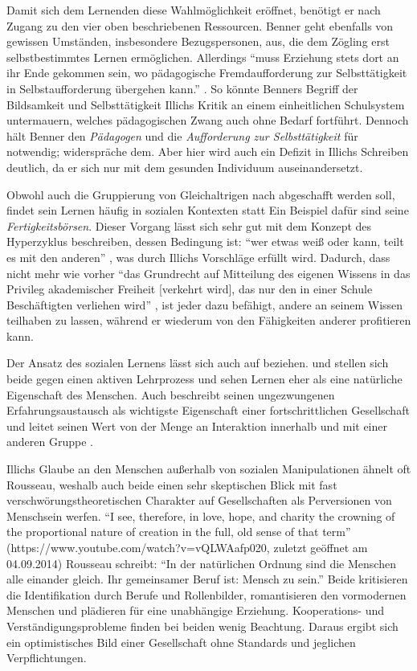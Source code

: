 Damit sich dem Lernenden diese Wahlmöglichkeit eröffnet, benötigt er nach \citeauthor{Illich-1971} Zugang zu den vier oben beschriebenen Ressourcen.
Benner geht ebenfalls von gewissen Umständen, insbesondere Bezugspersonen, aus, die dem Zögling erst selbstbestimmtes Lernen ermöglichen.
Allerdings ``muss Erziehung stets dort an ihr Ende gekommen sein, wo pädagogische Fremdaufforderung zur Selbsttätigkeit in Selbstaufforderung übergehen kann.'' \parencite[91]{benner-2012}.
So könnte Benners Begriff der Bildsamkeit und Selbsttätigkeit Illichs Kritik an einem einheitlichen Schulsystem untermauern, welches pädagogischen Zwang auch ohne Bedarf fortführt.
Dennoch hält Benner den \emph{Pädagogen} und die \emph{Aufforderung zur Selbsttätigkeit} für notwendig; \citeauthor{Illich-1971} widerspräche dem.
Aber hier wird auch ein Defizit in Illichs Schreiben deutlich, da er sich nur mit dem gesunden Individuum auseinandersetzt.

Obwohl auch die Gruppierung von Gleichaltrigen nach \citeauthor{Illich-1971} abgeschafft werden soll, findet sein Lernen häufig in sozialen Kontexten statt
Ein Beispiel dafür sind seine \emph{Fertigkeitsbörsen}.
Dieser Vorgang lässt sich sehr gut mit dem Konzept des Hyperzyklus beschreiben, dessen Bedingung ist: ``wer etwas weiß oder kann, teilt es mit den anderen'' \parencite[123]{Zimpel2012}, was durch Illichs Vorschläge erfüllt wird.
Dadurch, dass nicht mehr wie vorher ``das Grundrecht auf Mitteilung des eigenen Wissens in das Privileg akademischer Freiheit [verkehrt wird], das nur den in einer Schule Beschäftigten verliehen wird'' \parencite[97]{Illich-1971}, ist jeder dazu befähigt, andere an seinem Wissen teilhaben zu lassen, während er wiederum von den Fähigkeiten anderer profitieren kann.

Der Ansatz des sozialen Lernens lässt sich auch auf \citeauthor{Dewey2010}  beziehen.
\citeauthor{Illich-1971} und \citeauthor{Dewey2010}  stellen sich beide gegen einen aktiven Lehrprozess und sehen Lernen eher als eine natürliche Eigenschaft des Menschen.
Auch \citeauthor{Dewey2010}  beschreibt seinen ungezwungenen Erfahrungsaustausch als wichtigste Eigenschaft einer fortschrittlichen Gesellschaft und leitet seinen Wert von der Menge an Interaktion innerhalb und mit einer anderen Gruppe \parencite[vgl.][89]{Dewey2010}.

Illichs Glaube an den Menschen außerhalb von sozialen Manipulationen ähnelt oft Rousseau, weshalb auch beide einen sehr skeptischen Blick mit fast verschwörungstheoretischen Charakter auf Gesellschaften als Perversionen von Menschsein werfen.
``I see, therefore, in love, hope, and charity the crowning of the proportional nature of creation in the full, old sense of that term'' (https://www.youtube.com/watch?v=vQLWAafp020, zuletzt geöffnet am 04.09.2014)
Rousseau schreibt: ``In der natürlichen Ordnung sind die Menschen alle einander gleich. Ihr gemeinsamer Beruf ist: Mensch zu sein.'' \parencite[50]{rousseau-1762}
Beide kritisieren die Identifikation durch Berufe und Rollenbilder, romantisieren den vormodernen Menschen und plädieren für eine unabhängige Erziehung.
Kooperations- und Verständigungsprobleme finden bei beiden wenig Beachtung.
Daraus ergibt sich ein optimistisches Bild einer Gesellschaft ohne Standards und jeglichen Verpflichtungen.


